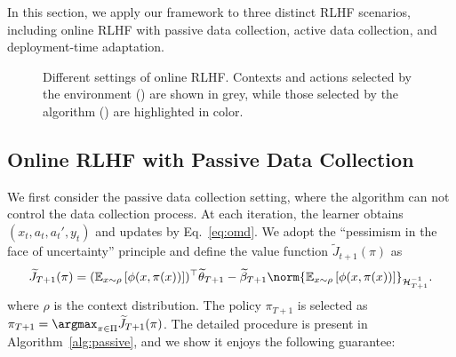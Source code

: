 In this section, we apply our framework to three distinct RLHF scenarios, including online RLHF with passive data collection, active data collection, and deployment-time adaptation.

\begin{figure*}
  \begin{minipage}[t]{0.99\textwidth}
      \centering
      \hfill
      \hfill
  \end{minipage}
  \caption{Different settings of online RLHF. Contexts and actions selected by the environment (\faGlobe) are shown in grey, while those selected by the algorithm (\faSearch) are highlighted in color.}
  \label{fig:settings}
\end{figure*}

\subsection{Online RLHF with Passive Data Collection}
We first consider the passive data collection setting, where the algorithm can not control the data collection process. At each iteration, the learner obtains $(x_t, a_t, a_t', y_t)$ and updates by Eq.~\eqref{eq:omd}. We adopt the ``pessimism in the face of uncertainty'' principle and define the value function $\widetilde{J}_{t+1}(\pi)$ as
\begin{align}
  \label{eq:optimistic_value}
  \widetilde{J}_{T+1}(\pi) = (\mathbb{E}_{x \sim \rho} \left[\phi(x, \pi(x))\right])^\top \widetilde{\theta}_{T+1} - \widetilde{\beta}_{T+1} \norm{\mathbb{E}_{x \sim \rho} \left[\phi(x, \pi(x))\right]}_{\mathcal{H}_{T+1}^{-1}}.
\end{align}
where $\rho$ is the context distribution. The policy $\pi_{T+1}$ is selected as $\pi_{T+1} = \argmax_{\pi \in \Pi} \widetilde{J}_{T+1}(\pi)$. The detailed procedure is present in Algorithm~\ref{alg:passive}, and we show it enjoys the following guarantee:

